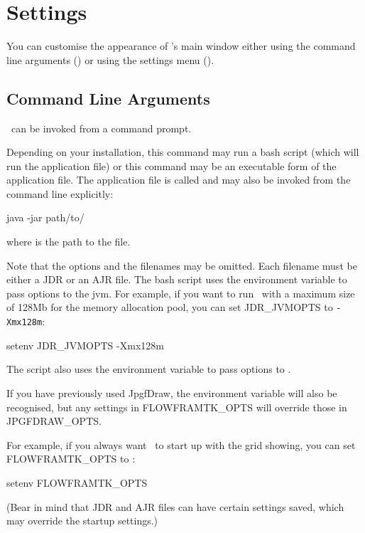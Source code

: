 \chapter{Settings}\label{sec:settings}

You can customise the appearance of \FlowframTk's main window either
using the command line arguments () or
using the settings menu ().

\section{Command Line Arguments}\label{sec:cmdargs}

\FlowframTk\ can be invoked from a command prompt. 


Depending on your installation, this command may run a bash script
(which will run the application  file) or this command may
be an executable form of the application  file.
The application  file is called 
and may also be invoked from the command line explicitly:
\begin{terminal}
java -jar path/to/
\end{terminal}
where  is the path to the 
file.

Note that the options and the filenames may be omitted.
Each filename must be either a \gls{JDR} or an \gls{AJR} file.
The  bash script uses the environment variable 
 to pass
options to the \gls{jvm}.  For example, if you want to run \FlowframTk\ with
a maximum size of 128Mb for the memory allocation pool, you can set
\gls{JDR_JVMOPTS} to \verb|-Xmx128m|:
\begin{terminal}
setenv \gls{JDR_JVMOPTS} -Xmx128m
\end{terminal}
The  script also uses the environment variable
 to pass options to \FlowframTk.

\begin{information}
If you have previously used \gls{JpgfDraw}, the  
environment variable will also be recognised, but any settings in 
\gls{FLOWFRAMTK_OPTS} will override those in \gls{JPGFDRAW_OPTS}.
\end{information}

For example, if you always want \FlowframTk\ to start up with the grid showing,
 you can set \gls{FLOWFRAMTK_OPTS} to :
\begin{terminal}
setenv \gls{FLOWFRAMTK_OPTS} 
\end{terminal}
(Bear in mind that \gls{JDR} and \gls{AJR} files can have certain
settings saved, which may override the startup settings.)

